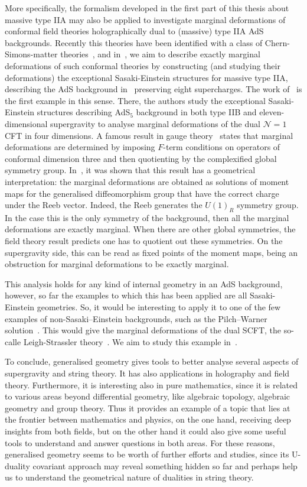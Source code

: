 \documentclass[debug]{phd}
\begin{document}
		More specifically, the formalism developed in the first part of this thesis about massive type IIA may also be applied to investigate marginal deformations of conformal field theories holographically dual to (massive) type IIA AdS backgrounds.
		Recently this theories have been identified with a class of Chern-Simons-matter theories~\cite{Guarino:2015jca}, and in~\cite{oscar4}, we aim to describe exactly marginal deformations of such conformal theories by constructing (and studying their deformations) the exceptional Sasaki-Einstein structures for massive type IIA, describing the AdS background in~\cite{Varela:2015uca} preserving eight supercharges.
		The work of~\cite{AshmoreDef} is the first example in this sense.
		There, the authors study the exceptional Sasaki-Einstein structures describing AdS$_5$ background in both type IIB and eleven-dimensional supergravity to analyse marginal deformations of the dual $\mathcal{N}=1$ CFT in four dimensions.
		A famous result in gauge theory~\cite{Green:2010da} states that marginal deformations are determined by imposing $F$-term conditions on operators of conformal dimension three and then quotienting by the complexified global symmetry group.
		In~\cite{AshmoreDef}, it was shown that this result has a geometrical interpretation: the marginal deformations are obtained as solutions of moment maps for the generalised diffeomorphism group that have the correct charge under the Reeb vector.
		Indeed, the Reeb generates the $U(1)_R$ symmetry group.
		In the case this is the only symmetry of the background, then all the marginal deformations are exactly marginal.
		When there are other global symmetries, the field theory result predicts one has to quotient out these symmetries.
		On the supergravity side, this can be read as fixed points of the moment maps, being an obstruction for marginal deformations to be exactly marginal.
		
		This analysis holds for any kind of internal geometry in an AdS background, however, so far the examples to which this has been applied are all Sasaki-Einstein geometries.
		So, it would be interesting to apply it to one of the few examples of non-Sasaki–Einstein backgrounds, such as the Pilch–Warner solution~\cite{PilchWarner}.
		This would give the marginal deformations of the dual SCFT, the so-calle Leigh-Strassler theory~\cite{LSexact}.
		We aim to study this example in~\cite{oscar3}.
		
		To conclude, generalised geometry gives tools to better analyse several aspects of supergravity and string theory.
		It has also applications in holography and field theory.
		Furthermore, it is interesting also in pure mathematics, since it is related to various areas beyond differential geometry, like algebraic topology, algebraic geometry and group theory.
		Thus it provides an example of a topic that lies at the frontier between mathematics and physics, on the one hand, receiving deep insights from both fields, but on the other hand it could also give some useful tools to understand and answer questions in both areas.
		For these reasons, generalised geometry seems to be worth of further efforts and studies, since its U-duality covariant approach may reveal something hidden so far and perhaps help us to understand the geometrical nature of dualities in string theory.
		
\end{document}
